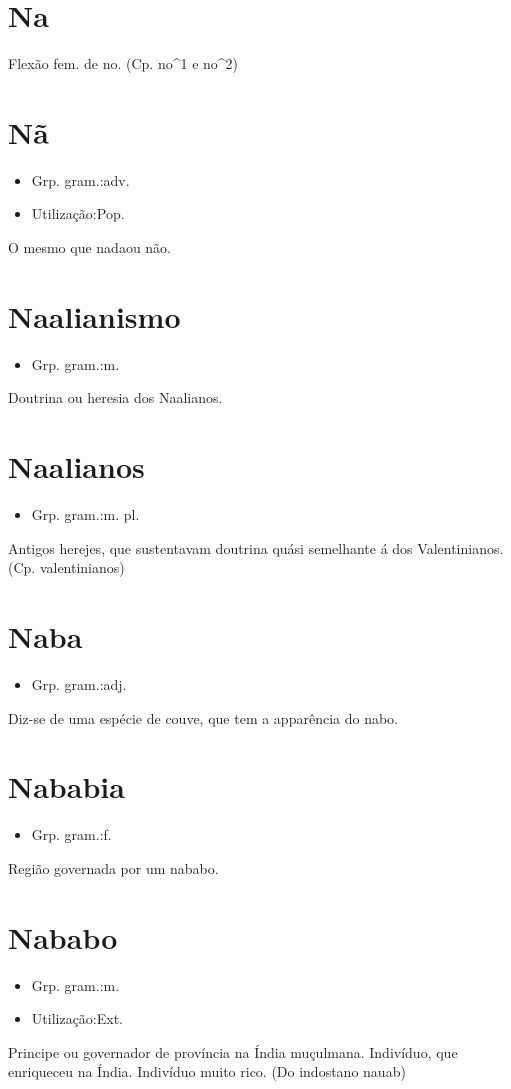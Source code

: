 \section{Na}
Flexão fem. de \textunderscore no\textunderscore .
(Cp. \textunderscore no\textunderscore ^1 e \textunderscore no\textunderscore ^2)
\section{Nã}
\begin{itemize}
\item {Grp. gram.:adv.}
\end{itemize}
\begin{itemize}
\item {Utilização:Pop.}
\end{itemize}
O mesmo que \textunderscore nada\textunderscore  ou \textunderscore não\textunderscore .
\section{Naalianismo}
\begin{itemize}
\item {Grp. gram.:m.}
\end{itemize}
Doutrina ou heresia dos Naalianos.
\section{Naalianos}
\begin{itemize}
\item {Grp. gram.:m. pl.}
\end{itemize}
Antigos herejes, que sustentavam doutrina quási semelhante á dos Valentinianos.
(Cp. \textunderscore valentinianos\textunderscore )
\section{Naba}
\begin{itemize}
\item {Grp. gram.:adj.}
\end{itemize}
Diz-se de uma espécie de couve, que tem a apparência do nabo.
\section{Nababia}
\begin{itemize}
\item {Grp. gram.:f.}
\end{itemize}
Região governada por um nababo.
\section{Nababo}
\begin{itemize}
\item {Grp. gram.:m.}
\end{itemize}
\begin{itemize}
\item {Utilização:Ext.}
\end{itemize}
Principe ou governador de província na Índia muçulmana.
Indivíduo, que enriqueceu na Índia.
Indivíduo muito rico.
(Do indostano \textunderscore nauab\textunderscore )
